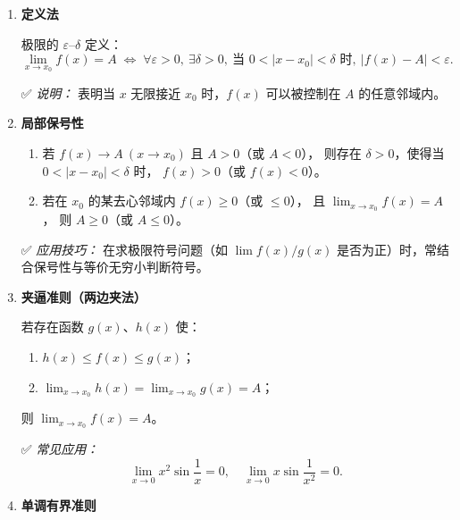 \begin{enumerate}
    \item \textbf{定义法}

          极限的 $\varepsilon$–$\delta$ 定义：
          \[
              \lim_{x \to x_0} f(x) = A
              \;\Leftrightarrow\;
              \forall \varepsilon > 0,\ \exists \delta > 0,\
              \text{当 } 0 < |x - x_0| < \delta \text{ 时},\ |f(x) - A| < \varepsilon.
          \]

          ✅ \textit{说明：}
          表明当 $x$ 无限接近 $x_0$ 时，$f(x)$ 可以被控制在 $A$ 的任意邻域内。

    \item \textbf{局部保号性}

          \begin{enumerate}
              \item 若 $f(x) \to A \ (x \to x_0)$ 且 $A > 0$（或 $A < 0$），
                    则存在 $\delta > 0$，使得当 $0 < |x - x_0| < \delta$ 时，
                    $f(x) > 0$（或 $f(x) < 0$）。

              \item 若在 $x_0$ 的某去心邻域内 $f(x) \ge 0$（或 $\le 0$），
                    且 $\displaystyle \lim_{x \to x_0} f(x) = A$，
                    则 $A \ge 0$（或 $A \le 0$）。
          \end{enumerate}

          ✅ \textit{应用技巧：}
          在求极限符号问题（如 $\lim f(x)/g(x)$ 是否为正）时，常结合保号性与等价无穷小判断符号。

    \item \textbf{夹逼准则（两边夹法）}

          若存在函数 $g(x)$、$h(x)$ 使：
          \begin{enumerate}
              \item $h(x) \le f(x) \le g(x)$；
              \item $\displaystyle \lim_{x \to x_0} h(x) = \lim_{x \to x_0} g(x) = A$；
          \end{enumerate}
          则 $\displaystyle \lim_{x \to x_0} f(x) = A$。

          ✅ \textit{常见应用：}
          \[
              \lim_{x \to 0} x^2 \sin\frac{1}{x} = 0, \quad
              \lim_{x \to 0} x \sin\frac{1}{x^2} = 0.
          \]

    \item \textbf{单调有界准则}


\end{enumerate}
